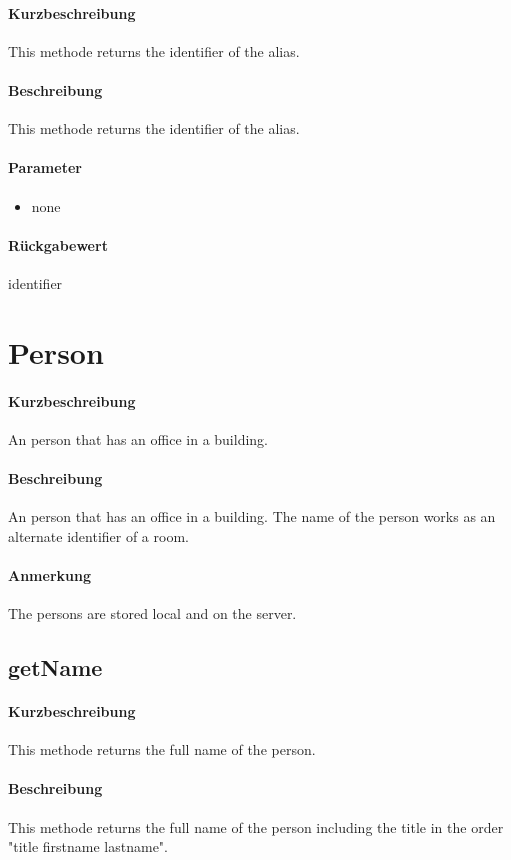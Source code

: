 \paragraph*{Kurzbeschreibung}
This methode returns the identifier of the alias.
\paragraph*{Beschreibung}
This methode returns the identifier of the alias.
\paragraph*{Parameter}
\begin{itemize}
    \item none
\end{itemize}
\paragraph*{Rückgabewert}
identifier


\section{Person}
\paragraph*{Kurzbeschreibung}
An person that has an office in a building.
\paragraph*{Beschreibung}
An person that has an office in a building. The name of the person works as an alternate identifier of a room.
\paragraph*{Anmerkung}
The persons are stored local and on the server.

\subsection{getName}%
\paragraph*{Kurzbeschreibung}
This methode returns the full name of the person.
\paragraph*{Beschreibung}
This methode returns the full name of the person including the title in the order "title firstname lastname".

